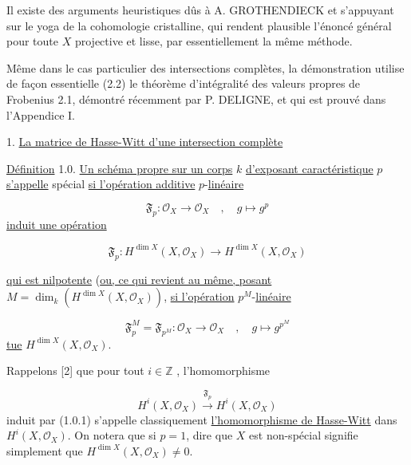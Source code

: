 Il existe des arguments heuristiques dûs à A. GROTHENDIECK et s'appuyant sur le yoga de la cohomologie cristalline, qui rendent plausible l'énoncé général pour toute $X$ projective et lisse, par essentiellement la même méthode.

Même dans le cas particulier des intersections complètes, la démonstration utilise de façon essentielle (2.2) le théorème d'intégralité des valeurs propres de Frobenius 2.1, démontré récemment par P. DELIGNE, et qui est prouvé dans l'Appendice I.


1. \underline{La matrice de Hasse-Witt d'une intersection complète}

\underline{Définition} 1.0. \underline{Un schéma propre sur un corps} $k$ \underline{d'exposant caractéristique} $p$ \underline{s'appelle} spécial \underline{si l'opération additive} $p$-\underline{linéaire}

\begin{equation}\tag{1.0.1}
\mathfrak{F}_p : \mathcal{O}_X \longrightarrow \mathcal{O}_X \quad , \quad g \longmapsto g^p
\end{equation}
\underline{induit une opération}

\begin{equation}\tag{1.0.2}
\mathfrak{F}_p : H^{\dim X}(X,\mathcal{O}_X) \longrightarrow H^{\dim X}(X,\mathcal{O}_X) 
\end{equation}


 \underline{qui est nilpotente} (\underline{ou, ce qui revient au même, posant} $M = \dim_k(H^{\dim X}(X,\mathcal{O}_X))$, \underline{si l'opération} $p^M$-\underline{linéaire}

\begin{equation}\tag{1.0.3}
\mathfrak{F}_p^M = \mathfrak{F}_{p^M} : \mathcal{O}_X \longrightarrow \mathcal{O}_X \quad , \quad g \longmapsto g^{p^M}
\end{equation}
\underline{tue} $H^{\dim X}(X,\mathcal{O}_X)$.

Rappelons [2] que pour tout $i \in \mathbb{Z}$ , l'homomorphisme

\begin{equation*}
H^i(X,\mathcal{O}_X) \stackrel{\mathfrak{F}_p}{\longrightarrow} H^i(X,\mathcal{O}_X)
\end{equation*}
induit par (1.0.1) s'appelle classiquement \underline{l'homomorphisme de Hasse-Witt} dans $H^i(X,\mathcal{O}_X)$. On notera que si $p = 1$, dire que $X$ est non-spécial signifie simplement que $H^{\dim X}(X,\mathcal{O}_X) \neq 0$.

